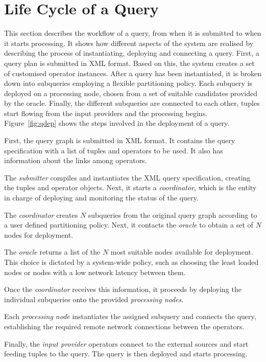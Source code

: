 \section{Life Cycle of a Query}
\label{sec:qdep}
This section describes the workflow of a query, from when it is submitted to when it starts processing.
It shows how different aspects of the system are realised by describing the process of instantiating,
deploying and connecting a query.
First, a query plan is submitted in XML format. Based on this, the system creates a set of customised
operator instances. After a query has been instantiated, it is broken down into subqueries employing a
flexible partitioning policy. Each subquery is deployed on a processing node, chosen from a set of
suitable candidates provided by the oracle. Finally, the different subqueries are connected to each
other, tuples start flowing from the input providers and the processing begins.
Figure~\ref{fig:qdep} shows the steps involved in the deployment of a query.
\begin{myenumerate}
  \item First, the query graph is submitted in XML format. It contains the query specification
  with a list of tuples and operators to be used. It also has information about the links among
  operators. 
  \item The \emph{submitter} compiles and instantiates the XML query specification, creating the tuples
  and operator objects. Next, it starts a \emph{coordinator}, which is the entity in charge of deploying
  and monitoring the status of the query.
  \item The \emph{coordinator} creates $N$ subqueries from the original query graph according to a user
  defined partitioning policy. Next, it contacts the \emph{oracle} to obtain a set of $N$ nodes for
  deployment.\\
  \item The \emph{oracle} returns a list of the $N$ most suitable nodes available for deployment. This
  choice is dictated by a system-wide policy, such as choosing the least loaded nodes or nodes with a low
  network latency between them.
  \item Once the \emph{coordinator} receives this information, it proceeds by deploying the individual
  subqueries onto the provided \emph{processing nodes}.
  \item Each \emph{processing node} instantiates the assigned subquery and connects the query,
  establishing the required remote network connections between the operators.
  \item Finally, the \emph{input provider} operators connect to the external sources and start feeding
  tuples to the query. The query is then deployed and starts processing.
\end{myenumerate}
